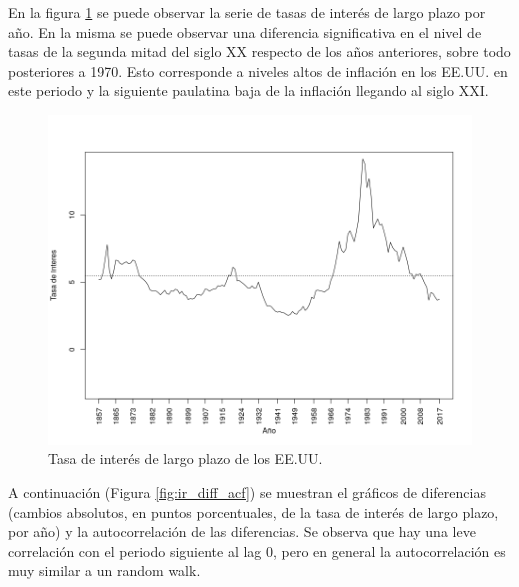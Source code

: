 \documentclass[a4paper]{article}
\begin{document}
En la figura \ref{fig:ir_orig} se puede observar la serie de tasas de interés de largo plazo por año. En la misma se puede observar una diferencia significativa en el nivel de tasas de la segunda mitad del siglo XX respecto de los años anteriores, sobre todo posteriores a 1970. Esto corresponde a niveles altos de inflación en los EE.UU. en este periodo y la siguiente paulatina baja de la inflación llegando al siglo XXI.

\begin{figure}[H]
	\centering
	\includegraphics[width=0.75\linewidth]{ir_orig.png}
	
	\caption{Tasa de interés de largo plazo de los EE.UU.}
	\label{fig:ir_orig}
\end{figure}

A continuación (Figura \ref{fig:ir_diff_acf}) se muestran el gráficos de diferencias (cambios absolutos, en puntos porcentuales, de la tasa de interés de largo plazo, por año) y la autocorrelación de las diferencias. Se observa que hay una leve correlación con el periodo siguiente al lag 0, pero en general la autocorrelación es muy similar a un random walk.
\end{document}
